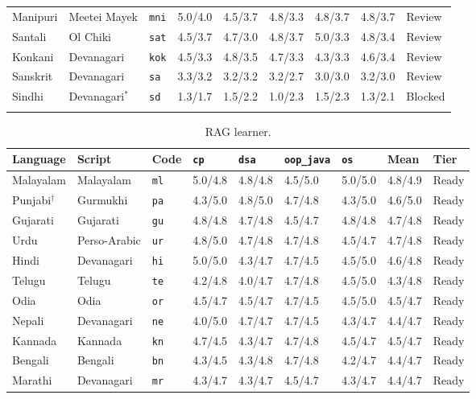\documentclass[pdflatex,sn-mathphys-num]{sn-jnl}%
\theoremstyle{thmstyleone}%
\theoremstyle{thmstyletwo}%
\theoremstyle{thmstylethree}%
\begin{document}
\begin{appendices}
\begin{table}[p]
\begin{tabular*}{\textwidth}{@{\extracolsep\fill}lllllllll}
Manipuri & Meetei Mayek & \texttt{mni} & 5.0/4.0 & 4.5/3.7 & 4.8/3.3 & 4.8/3.7 & 4.8/3.7 & Review \\
Santali & Ol Chiki & \texttt{sat} & 4.5/3.7 & 4.7/3.0 & 4.8/3.7 & 5.0/3.3 & 4.8/3.4 & Review \\
Konkani & Devanagari & \texttt{kok} & 4.5/3.3 & 4.8/3.5 & 4.7/3.3 & 4.3/3.3 & 4.6/3.4 & Review \\
Sanskrit & Devanagari & \texttt{sa} & 3.3/3.2 & 3.2/3.2 & 3.2/2.7 & 3.0/3.0 & 3.2/3.0 & Review \\
Sindhi & Devanagari$^{*}$ & \texttt{sd} & 1.3/1.7 & 1.5/2.2 & 1.0/2.3 & 1.5/2.3 & 1.3/2.1 & Blocked \\
\botrule
\end{tabular*}
\end{table}

\begin{table}[p]
\caption{RAG learner.}\label{tab:rag-matrix}
\footnotesize
\begin{tabular*}{\textwidth}{@{\extracolsep\fill}lllllllll}
\toprule
Language & Script & Code & \texttt{cp} & \texttt{dsa} & \texttt{oop\_java} & \texttt{os} & Mean & Tier \\
\midrule
Malayalam & Malayalam & \texttt{ml} & 5.0/4.8 & 4.8/4.8 & 4.5/5.0 & 5.0/5.0 & 4.8/4.9 & Ready \\
Punjabi$^\dagger$ & Gurmukhi & \texttt{pa} & 4.3/5.0 & 4.8/5.0 & 4.7/4.8 & 4.3/5.0 & 4.6/5.0 & Ready \\
Gujarati & Gujarati & \texttt{gu} & 4.8/4.8 & 4.7/4.8 & 4.5/4.7 & 4.8/4.8 & 4.7/4.8 & Ready \\
Urdu & Perso-Arabic & \texttt{ur} & 4.8/5.0 & 4.7/4.8 & 4.7/4.8 & 4.5/4.7 & 4.7/4.8 & Ready \\
Hindi & Devanagari & \texttt{hi} & 5.0/5.0 & 4.3/4.7 & 4.7/4.5 & 4.5/5.0 & 4.6/4.8 & Ready \\
Telugu & Telugu & \texttt{te} & 4.2/4.8 & 4.0/4.7 & 4.7/4.8 & 4.5/5.0 & 4.3/4.8 & Ready \\
Odia & Odia & \texttt{or} & 4.5/4.7 & 4.5/4.7 & 4.7/4.5 & 4.5/5.0 & 4.5/4.7 & Ready \\
Nepali & Devanagari & \texttt{ne} & 4.0/5.0 & 4.7/4.7 & 4.7/4.5 & 4.3/4.7 & 4.4/4.7 & Ready \\
Kannada & Kannada & \texttt{kn} & 4.7/4.5 & 4.3/4.7 & 4.7/4.8 & 4.5/4.7 & 4.5/4.7 & Ready \\
Bengali & Bengali & \texttt{bn} & 4.3/4.5 & 4.3/4.8 & 4.7/4.8 & 4.2/4.7 & 4.4/4.7 & Ready \\
Marathi & Devanagari & \texttt{mr} & 4.3/4.7 & 4.3/4.7 & 4.5/4.7 & 4.3/4.7 & 4.4/4.7 & Ready \\

\end{tabular*}
\end{table}
\end{appendices}
\end{document}
